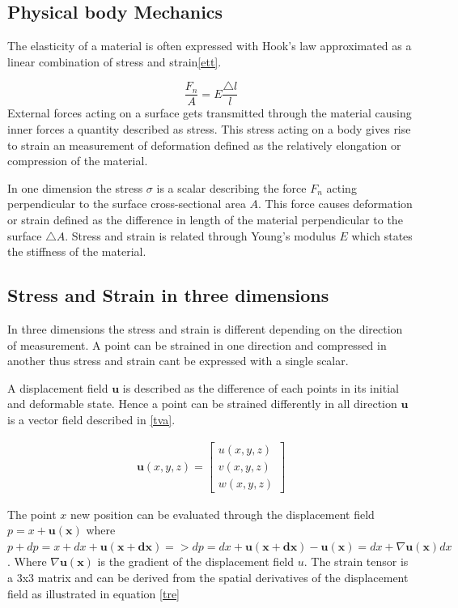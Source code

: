 \documentclass[10pt,a4paper]{article}
\begin{document}
\subsection{Physical body Mechanics}
The elasticity of a material is often expressed with Hook's law approximated as a linear combination of stress and strain\ref{ett}.

\begin{equation}\label{ett}
    \frac{F_{n}}{A} = E \frac{\triangle l}{l}
\end{equation}
External forces acting on a surface gets transmitted through the material causing inner forces a quantity described as stress. This stress acting on a body gives rise to strain an measurement of deformation defined as the relatively elongation or compression of the material.

In one dimension the stress $\sigma$ is a scalar describing the force $ F_{n}$ acting perpendicular to the surface cross-sectional area $A$.
This force causes deformation or strain defined as the difference in length of the material perpendicular to the surface $\triangle A$. Stress and strain is related through Young's modulus $E$ which states the stiffness of the material.

\subsection{Stress and Strain in three dimensions}\label{stressnstrain}
In three dimensions the stress and strain is different depending on the direction of measurement. A point can be strained in one direction and compressed in another thus stress and strain cant be expressed with a single scalar.

A displacement field $\mathbf{u}$ is described as the difference of each points in its initial and deformable state. Hence a point can be strained differently in all direction $\mathbf{u}$ is a vector field described in \ref{tva}.


\begin{eqnarray}\label{tva}
    \mathbf{u}(x, y, z) = \left[ \begin{array}{c}
u(x, y, z) \\
v(x, y, z) \\
w(x, y, z) \end{array} \right]
\end{eqnarray}

The point $x$ new position can be evaluated through the displacement field $p=x+\mathbf{u(x)}$
where $p+dp = x+dx + \mathbf{u(x+dx)} => dp = dx + \mathbf{u(x+dx)}-\mathbf{u(x)} = dx +\nabla \mathbf{u(x)}dx$. Where $\nabla \mathbf{u(x)}$ is the gradient of the displacement field $u$. The strain tensor is a 3x3 matrix and can be derived from the spatial derivatives of the displacement field as illustrated in equation \ref{tre}
\end{document}
